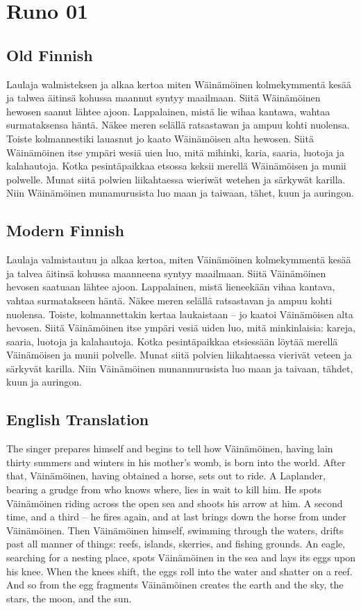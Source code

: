 \section{Runo 01}

\subsection{Old Finnish}
Laulaja walmisteksen ja alkaa kertoa miten Wäinämöinen kolmekymmentä kesää ja talwea äitinsä kohussa maannut syntyy maailmaan. Siitä Wäinämöinen hewosen saanut lähtee ajoon. Lappalainen, mistä lie wihaa kantawa, wahtaa surmataksensa häntä. Näkee meren selällä ratsastawan ja ampuu kohti nuolensa. Toiste kolmannestiki lauasnut jo kaato Wäinämöisen alta hewosen. Siitä Wäinämöinen itse ympäri wesiä uien luo, mitä mihinki, karia, saaria, luotoja ja kalahautoja. Kotka pesintäpaikkaa etsossa keksii merellä Wäinämöisen ja munii polwelle. Munat siitä polwien liikahtaessa wieriwät wetehen ja särkywät karilla. Niin Wäinämöinen munamurusista luo maan ja taiwaan, tähet, kuun ja auringon.

\subsection{Modern Finnish}
Laulaja valmistautuu ja alkaa kertoa, miten Väinämöinen kolmekymmentä kesää ja talvea äitinsä kohussa maanneena syntyy maailmaan. Siitä Väinämöinen hevosen saatuaan lähtee ajoon. Lappalainen, mistä lieneekään vihaa kantava, vahtaa surmatakseen häntä. Näkee meren selällä ratsastavan ja ampuu kohti nuolensa. Toiste, kolmannettakin kertaa laukaistaan -- jo kaatoi Väinämöisen alta hevosen. Siitä Väinämöinen itse ympäri vesiä uiden luo, mitä minkinlaisia: kareja, saaria, luotoja ja kalahautoja. Kotka pesintäpaikkaa etsiessään löytää merellä Väinämöisen ja munii polvelle. Munat siitä polvien liikahtaessa vierivät veteen ja särkyvät karilla. Niin Väinämöinen munanmurusista luo maan ja taivaan, tähdet, kuun ja auringon.

\subsection{English Translation}
The singer prepares himself and begins to tell how Väinämöinen, having lain thirty summers and winters in his mother's womb, is born into the world. After that, Väinämöinen, having obtained a horse, sets out to ride. A Laplander, bearing a grudge from who knows where, lies in wait to kill him. He spots Väinämöinen riding across the open sea and shoots his arrow at him. A second time, and a third -- he fires again, and at last brings down the horse from under Väinämöinen. Then Väinämöinen himself, swimming through the waters, drifts past all manner of things: reefs, islands, skerries, and fishing grounds. An eagle, searching for a nesting place, spots Väinämöinen in the sea and lays its eggs upon his knee. When the knees shift, the eggs roll into the water and shatter on a reef. And so from the egg fragments Väinämöinen creates the earth and the sky, the stars, the moon, and the sun.

